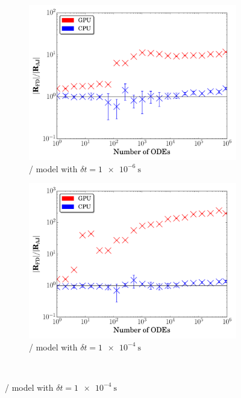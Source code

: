 \documentclass[preprint,review,11pt]{elsarticle}
\begin{document}
\begin{figure}[htb]
  \centering
  \begin{subfigure}{0.49\textwidth}
      \includegraphics[width=\linewidth]{H2_1e-06_ajac_comp.pdf}
      \caption{\slash{} model with $\delta t = \SI{1e-6}{\second}$}   
      \label{F:AJ_h2_small}
  \end{subfigure}
  \begin{subfigure}{0.49\textwidth}
      \includegraphics[width=\linewidth]{H2_1e-04_ajac_comp.pdf}
      \caption{\slash{} model with $\delta t = \SI{1e-4}{\second}$}
      \label{F:AJ_h2_large}
  \end{subfigure}
  \\

\end{figure}
\end{document}
